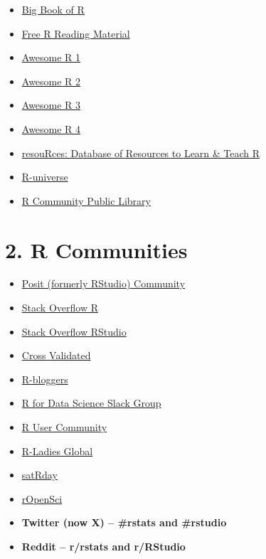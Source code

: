 \documentclass[
  letterpaper,
  DIV=11,
  numbers=noendperiod]{scrreprt}
\providecommand{\tightlist}{%
  \setlength{\itemsep}{0pt}\setlength{\parskip}{0pt}}\usepackage{longtable,booktabs,array}
\begin{document}
\begin{itemize}
\tightlist
\item
  \href{https://www.bigbookofr.com/}{Big Book of R}
\item
  \href{https://committedtotape.shinyapps.io/freeR/}{Free R Reading
  Material}
\item
  \href{https://github.com/qinwf/awesome-R}{Awesome R 1}
\item
  \href{https://github.com/uhub/awesome-r}{Awesome R 2}
\item
  \href{https://github.com/ktaranov/AwesomeR}{Awesome R 3}
\item
  \href{https://github.com/iamericfletcher/awesome-r-learning-resources}{Awesome
  R 4}
\item
  \href{https://www.resourcesdatabase.com/}{resouRces: Database of
  Resources to Learn \& Teach R}
\item
  \href{https://r-universe.dev/search/}{R-universe}
\item
  \href{https://rviews.rstudio.com/2021/11/04/bookdown-org/}{R Community
  Public Library}
\end{itemize}

\hypertarget{r-communities}{%
\section*{2. R Communities}\label{r-communities}}


\begin{itemize}
\tightlist
\item
  \href{https://community.rstudio.com/}{Posit (formerly RStudio)
  Community}
\item
  \href{https://stackoverflow.com/questions/tagged/r}{Stack Overflow R}
\item
  \href{https://stackoverflow.com/questions/tagged/rstudio}{Stack
  Overflow RStudio}
\item
  \href{https://stats.stackexchange.com/?tags=r}{Cross Validated}
\item
  \href{https://www.r-bloggers.com/}{R-bloggers}
\item
  \href{https://rfordatasci.com/}{R for Data Science Slack Group}
\item
  \href{https://www.linkedin.com/company/r-user-community/}{R User
  Community}
\item
  \href{https://rladies.org/}{R-Ladies Global}
\item
  \href{https://satrdays.org/}{satRday}
\item
  \href{https://ropensci.org/community/}{rOpenSci}
\item
  \textbf{Twitter (now X) -- \#rstats and \#rstudio}
\item
  \textbf{Reddit -- r/rstats and r/RStudio}
\end{itemize}
\end{document}
